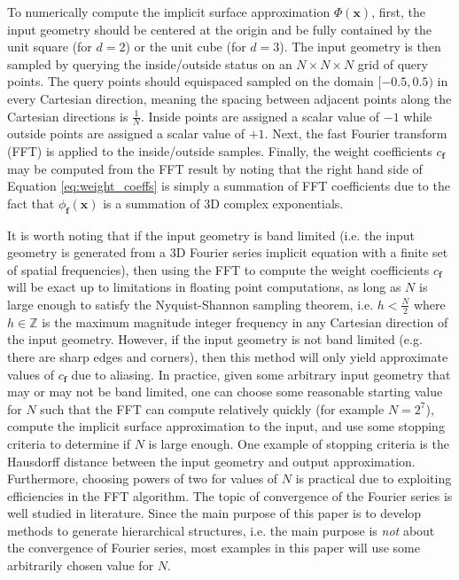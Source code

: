 \documentclass[acmtog]{acmart}
\begin{document}
To numerically compute the implicit surface approximation $\Phi(\mathbf{x})$, first, the input geometry should be centered at the origin and be fully contained by the unit square (for $d = 2$) or the unit cube (for $d = 3$). The input geometry is then sampled by querying the inside/outside status on an $N \times N \times N$ grid of query points. The query points should equispaced sampled on the domain $[-0.5, 0.5)$ in every Cartesian direction, meaning the spacing between adjacent points along the Cartesian directions is $\frac{1}{N}$. Inside points are assigned a scalar value of $-1$ while outside points are assigned a scalar value of $+1$. Next, the fast Fourier transform (FFT) is applied to the inside/outside samples. Finally, the weight coefficients $c_{\mathbf{f}}$ may be computed from the FFT result by noting that the right hand side of Equation \ref{eq:weight_coeffs} is simply a summation of FFT coefficients due to the fact that $\phi_{\mathbf{f}}(\mathbf{x})$ is a summation of 3D complex exponentials.

It is worth noting that if the input geometry is band limited (i.e. the input geometry is generated from a 3D Fourier series implicit equation with a finite set of spatial frequencies), then using the FFT to compute the weight coefficients $c_{\mathbf{f}}$ will be exact up to limitations in floating point computations, as long as $N$ is large enough to satisfy the Nyquist-Shannon sampling theorem, i.e. $h < \frac{N}{2}$ where $h \in \mathbb{Z}$ is the maximum magnitude integer frequency in any Cartesian direction of the input geometry. However, if the input geometry is not band limited (e.g. there are sharp edges and corners), then this method will only yield approximate values of $c_{\mathbf{f}}$ due to aliasing. In practice, given some arbitrary input geometry that may or may not be band limited, one can choose some reasonable starting value for $N$ such that the FFT can compute relatively quickly (for example $N = 2^7$), compute the implicit surface approximation to the input, and use some stopping criteria to determine if $N$ is large enough. One example of stopping criteria is the Hausdorff distance between the input geometry and output approximation. Furthermore, choosing powers of two for values of $N$ is practical due to exploiting efficiencies in the FFT algorithm. The topic of convergence of the Fourier series is well studied in literature. Since the main purpose of this paper is to develop methods to generate hierarchical structures, i.e. the main purpose is \textit{not} about the convergence of Fourier series, most examples in this paper will use some arbitrarily chosen value for $N$.
\end{document}
